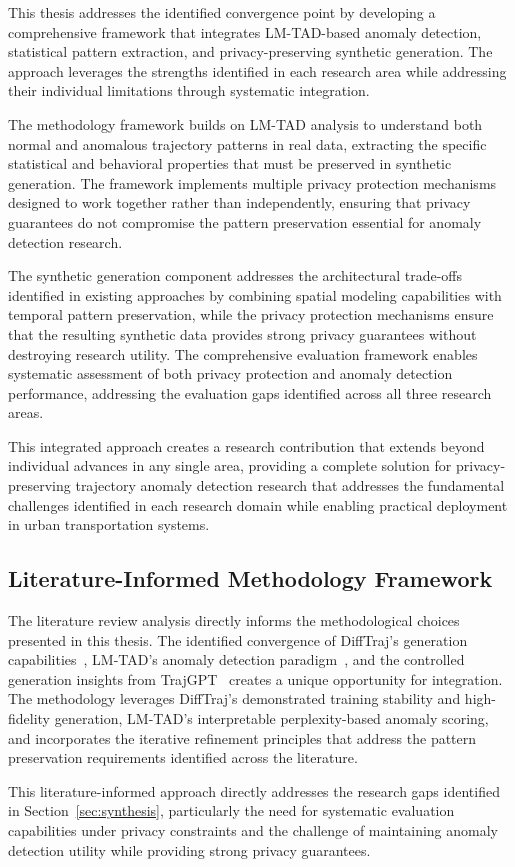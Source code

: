 This thesis addresses the identified convergence point by developing a comprehensive framework that integrates LM-TAD-based anomaly detection, statistical pattern extraction, and privacy-preserving synthetic generation. The approach leverages the strengths identified in each research area while addressing their individual limitations through systematic integration.

The methodology framework builds on LM-TAD analysis to understand both normal and anomalous trajectory patterns in real data, extracting the specific statistical and behavioral properties that must be preserved in synthetic generation. The framework implements multiple privacy protection mechanisms designed to work together rather than independently, ensuring that privacy guarantees do not compromise the pattern preservation essential for anomaly detection research.

The synthetic generation component addresses the architectural trade-offs identified in existing approaches by combining spatial modeling capabilities with temporal pattern preservation, while the privacy protection mechanisms ensure that the resulting synthetic data provides strong privacy guarantees without destroying research utility. The comprehensive evaluation framework enables systematic assessment of both privacy protection and anomaly detection performance, addressing the evaluation gaps identified across all three research areas.

This integrated approach creates a research contribution that extends beyond individual advances in any single area, providing a complete solution for privacy-preserving trajectory anomaly detection research that addresses the fundamental challenges identified in each research domain while enabling practical deployment in urban transportation systems.

\subsection{Literature-Informed Methodology Framework}
\label{sec:lit-methodology-bridge}

The literature review analysis directly informs the methodological choices presented in this thesis. The identified convergence of DiffTraj's generation capabilities~\cite{zhuDiffTrajGeneratingGPS2023}, LM-TAD's anomaly detection paradigm~\cite{mbuyaTrajectoryAnomalyDetection2024}, and the controlled generation insights from TrajGPT~\cite{hsuTrajGPTControlledSynthetic2024} creates a unique opportunity for integration. The methodology leverages DiffTraj's demonstrated training stability and high-fidelity generation, LM-TAD's interpretable perplexity-based anomaly scoring, and incorporates the iterative refinement principles that address the pattern preservation requirements identified across the literature.

This literature-informed approach directly addresses the research gaps identified in Section~\ref{sec:synthesis}, particularly the need for systematic evaluation capabilities under privacy constraints and the challenge of maintaining anomaly detection utility while providing strong privacy guarantees.

